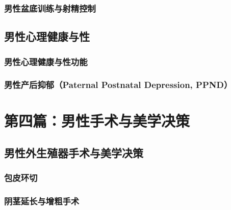\section{男性盆底训练与射精控制}

\chapter{男性心理健康与性}

\section{男性心理健康与性功能}

\section{男性产后抑郁（Paternal Postnatal Depression, PPND）}


\part*{第四篇：男性手术与美学决策}

\chapter{男性外生殖器手术与美学决策}

\section{包皮环切}

\section{阴茎延长与增粗手术}

